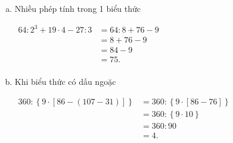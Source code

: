 \begin{tomtat}
\begin{vd}
\begin{enumerate}[a)]
	\item Nhiều phép tính trong 1 biểu thức
\begin{center}
	$\begin{aligned}
64:{2^3} + 19 \cdot 4 - 27:3& = 64:8 + 76 - 9\\
 &= 8 + 76 - 9\\
 &= 84 - 9\\
 &= 75.\\
\end{aligned}$
\end{center}
	\item Khi biểu thức có dấu ngoặc
\begin{center}
	$\begin{aligned}
360:\left\{ {9 \cdot \left[ {86 - (107 - 31)} \right]} \right\}
 &= 360:\left\{ {9 \cdot \left[ {86 - 76} \right]} \right\}\\
 &= 360:\left\{ {9 \cdot 10} \right\}\\
 &= 360:90\\
 &= 4.\\
\end{aligned}$
\end{center}
\end{enumerate}
\end{vd}
\end{tomtat}

